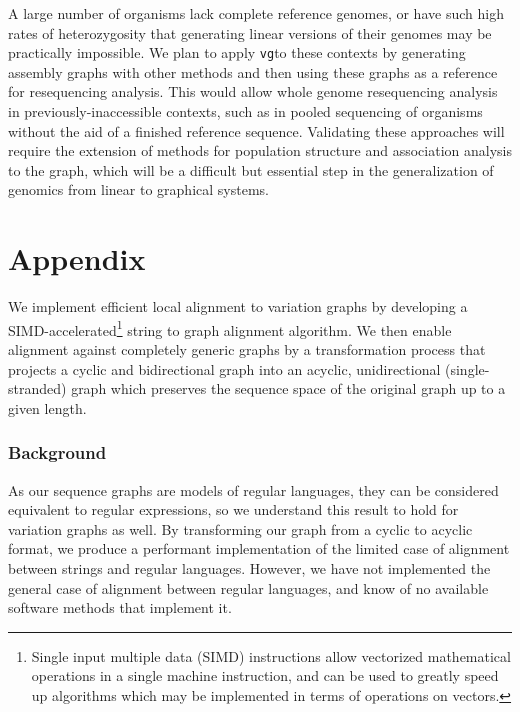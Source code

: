 \documentclass[12pt]{article}
\newcommand{\vg}{{\tt vg}}
\begin{document}
A large number of organisms lack complete reference genomes, or have such high rates of heterozygosity that generating linear versions of their genomes may be practically impossible.
We plan to apply \vg to these contexts by generating assembly graphs with other methods and then using these graphs as a reference for resequencing analysis.
This would allow whole genome resequencing analysis in previously-inaccessible contexts, such as in pooled sequencing of organisms without the aid of a finished reference sequence. 
Validating these approaches will require the extension of methods for population structure and association analysis to the graph, which will be a difficult but essential step in the generalization of genomics from linear to graphical systems.

{}



\newpage
\appendix
\section{Appendix}

We implement efficient local alignment to variation graphs by developing a SIMD-accelerated\footnote{Single input multiple data (SIMD) instructions allow vectorized mathematical operations in a single machine instruction, and can be used to greatly speed up algorithms which may be implemented in terms of operations on vectors.} string to graph alignment algorithm. We then enable alignment against completely generic graphs by a transformation process that projects a cyclic and bidirectional graph into an acyclic, unidirectional (single-stranded) graph which preserves the sequence space of the original graph up to a given length.

\subsubsection{Background}


As our sequence graphs are models of regular languages, they can be considered equivalent to regular expressions, so we understand this result to hold for variation graphs as well.
By transforming our graph from a cyclic to acyclic format, we produce a performant implementation of the limited case of alignment between strings and regular languages. However, we have not implemented the general case of alignment between regular languages, and know of no available software methods that implement it.
\end{document}
